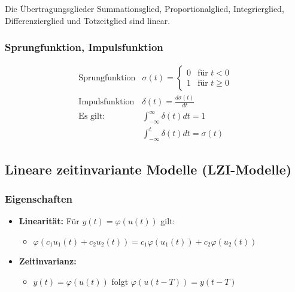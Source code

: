 \documentclass[10pt,a4paper]{article}
\renewcommand{\arraystretch}{1.5}
\begin{document}
Die Übertragungsglieder Summationsglied, Proportionalglied, Integrierglied, Differenzierglied und Totzeitglied sind linear.

\subsubsection{Sprungfunktion, Impulsfunktion}
\renewcommand{\arraystretch}{2}
$$
\begin{array}{ll}
	\text{Sprungfunktion} &	\sigma(t) = \begin{cases}
	0 & \text{für } t < 0 \\
	1 & \text{für } t ≥ 0
	\end{cases} \\
	\text{Impulsfunktion} & \delta(t) = \frac{d \sigma(t)}{dt} \\
	\text{Es gilt:} & \int_{-∞}^{∞} \delta(t) dt = 1 \\
	& \int_{-∞}^t \delta(t) dt = \sigma(t)
\end{array}
$$
\renewcommand{\arraystretch}{1.5}

\subsection{Lineare zeitinvariante Modelle (LZI-Modelle)}
\subsubsection*{Eigenschaften}
\begin{itemize}
	\item \textbf{Linearität:} Für $y(t) = \varphi(u(t))$ gilt:
	\begin{itemize}
		\item $\varphi(c_1 u_1(t) + c_2 u_2(t)) = c_1 \varphi(u_1(t)) + c_2 \varphi(u_2(t))$
	\end{itemize}
	\item \textbf{Zeitinvarianz:}
	\begin{itemize}
		\item $y(t) = \varphi(u(t))$ folgt $\varphi(u(t-T)) = y(t-T)$
	\end{itemize}
\end{itemize}
\end{document}
